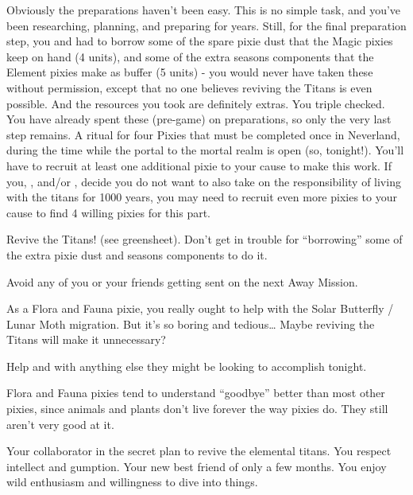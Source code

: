 \documentclass[char]{PP}
\begin{document}
Obviously the preparations haven’t been easy. This is no simple task, and you’ve been researching, planning, and preparing for years. Still, for the final preparation step, you and \cETitan{} had to borrow some of the spare pixie dust that the Magic pixies keep on hand (4 units), and some of the extra seasons components that the Element pixies make as buffer (5 units) - you would never have taken these without permission, except that no one believes reviving the Titans is even possible. And the resources you took are definitely extras. You triple checked. You have already spent these (pre-game) on preparations, so only the very last step remains. A ritual for four Pixies that must be completed once in Neverland, during the time while the portal to the mortal realm is open (so, tonight!). You’ll have to recruit at least one additional pixie to your cause to make this work. If you, \cETitan{}, and/or \cEAirship{}, decide you do not want to also take on the responsibility of living with the titans for 1000 years, you may need to recruit even more pixies to your cause to find 4 willing pixies for this part.


\begin{itemz}
	\item Revive the Titans! (see greensheet). Don’t get in trouble for “borrowing” some of the extra pixie dust and seasons components to do it.
	\item Avoid any of you or your friends getting sent on the next Away Mission.
	\item As a Flora and Fauna pixie, you really ought to help with the Solar Butterfly / Lunar Moth migration. But it’s so boring and tedious… Maybe reviving the Titans will make it unnecessary?
	\item Help \cETitan{} and \cEAirship{} with anything else they might be looking to accomplish tonight.
\end{itemz}

\begin{itemz}[Notes]
	\item Flora and Fauna pixies tend to understand ``goodbye'' better than most other pixies, since animals and plants don’t live forever the way pixies do. They still aren't very good at it.
\end{itemz}

\begin{contacts}
	\contact{\cETitan{}} Your collaborator in the secret plan to revive the elemental titans. You respect \cETitan{\their} intellect and gumption.
	\contact{\cEAirship{}} Your new best friend of only a few months. You enjoy \cEAirship{\their} wild enthusiasm and willingness to dive into things.
\end{contacts}
\end{document}

